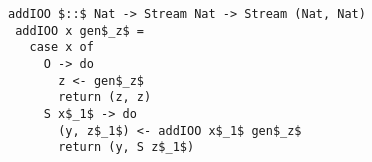 \begin{figure}[!t]
  \centering
  \begin{minipage}{0.59\columnwidth}
    \begin{lstlisting}[frame=tb]
 addIOO $::$ Nat -> Stream Nat -> Stream (Nat, Nat)
 addIOO x gen$_z$ =
   case x of
     O -> do
       z <- gen$_z$
       return (z, z)
     S x$_1$ -> do
       (y, z$_1$) <- addIOO x$_1$ gen$_z$
       return (y, S z$_1$)
    \end{lstlisting}
  \end{minipage}
\end{figure}
